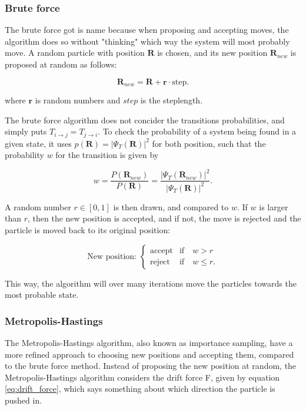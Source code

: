 \documentclass[norsk,a4paper,12pt]{article}
\begin{document}
\subsubsection{Brute force}
The brute force got is name because when proposing and accepting moves, the algorithm does so without "thinking" which way the system will most probably move. A random particle with position $\boldsymbol{R}$ is chosen, and its new position $\boldsymbol{R}_{new}$ is proposed at random as follows:

\begin{equation}
\boldsymbol{R}_{new} = \boldsymbol{R} + \boldsymbol{r}\cdot \text{step}.
\end{equation}

where $\boldsymbol{r}$ is random numbers and $step$ is the steplength.
\par 
\vspace{3mm}
The brute force algorithm does not concider the transitions probabilities, and simply puts $T_{i\rightarrow j} = T_{j\rightarrow i}$. To check the probability of a system being found in a given state, it uses $p(\boldsymbol{R})=|\Psi_T(\boldsymbol{R})|^2$ for both position, such that the probability $w$ for the transition is given by

\begin{equation}
w=\frac{P(\boldsymbol{R}_{new})}{P(\boldsymbol{R})}=\frac{|\Psi_T(\boldsymbol{R}_{new})|^2}{|\Psi_T(\boldsymbol{R})|^2}.
\end{equation}

A random number $r \in [0,1]$ is then drawn, and compared to $w$. If $w$ is larger than $r$, then the new position is accepted, and if not, the move is rejected and the particle is moved back to its original position:

\begin{equation}
\text{New position: }
\begin{cases} 
\text{accept} & \text{if}\quad w > r \\
\text{reject} & \text{if}\quad w \leq r.
\end{cases}
\end{equation}

This way, the algorithm will over many iterations move the particles towards the most probable state.


\subsubsection{Metropolis-Hastings}
The Metropolis-Hastings algorithm, also known as importance sampling, have a more refined approach to choosing new positions and accepting them, compared to the brute force method. Instead of proposing the new position at random, the Metropolis-Hastings algorithm considers the drift force F, given by equation \ref{eq:drift_force}, which says something about which direction the particle is pushed in. 
\end{document}
